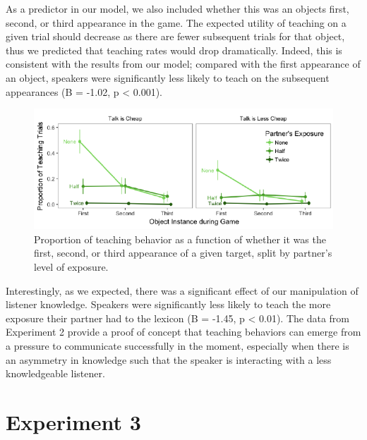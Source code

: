 \documentclass[10pt, letterpaper]{article}
\newenvironment{CodeChunk}{}{}
\begin{document}
As a predictor in our model, we also included whether this was an
objects first, second, or third appearance in the game. The expected
utility of teaching on a given trial should decrease as there are fewer
subsequent trials for that object, thus we predicted that teaching rates
would drop dramatically. Indeed, this is consistent with the results
from our model; compared with the first appearance of an object,
speakers were significantly less likely to teach on the subsequent
appearances (B = -1.02, p \textless{} 0.001).

\begin{CodeChunk}
\begin{figure}[H]

{\centering \includegraphics{figs/image3-1} 

}

\caption[Proportion of teaching behavior as a function of whether it was the first, second, or third appearance of a given target, split by partner's level of exposure]{Proportion of teaching behavior as a function of whether it was the first, second, or third appearance of a given target, split by partner's level of exposure.}\label{fig:image3}
\end{figure}
\end{CodeChunk}

Interestingly, as we expected, there was a significant effect of our
manipulation of listener knowledge. Speakers were significantly less
likely to teach the more exposure their partner had to the lexicon (B =
-1.45, p \textless{} 0.01). The data from Experiment 2 provide a proof
of concept that teaching behaviors can emerge from a pressure to
communicate successfully in the moment, especially when there is an
asymmetry in knowledge such that the speaker is interacting with a less
knowledgeable listener.

\section{Experiment 3}\label{experiment-3}
\end{document}
